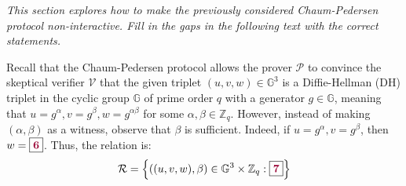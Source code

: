 \documentclass[../lecture-notes-105x135.tex]{subfiles}
\begin{document}
\newpage

    \textit{This section explores how to make the previously considered Chaum-Pedersen protocol non-interactive. Fill in the gaps in the following text with the correct statements.}

    Recall that the Chaum-Pedersen protocol allows the prover $\mathcal{P}$ to convince the skeptical verifier $\mathcal{V}$ that the given triplet $(u,v,w) \in \mathbb{G}^3$ is a Diffie-Hellman (DH) triplet in the cyclic group $\mathbb{G}$ of prime order $q$ with a generator $g \in \mathbb{G}$, meaning that $u=g^{\alpha},v=g^{\beta},w=g^{\alpha\beta}$ for some $\alpha,\beta \in \mathbb{Z}_q$. However, instead of making $(\alpha,\beta)$ as a witness, observe that $\beta$ is sufficient. Indeed, if $u=g^{\alpha},v=g^{\beta}$, then $w=\boxed{\textcolor{purple!80!black}{\textbf{6}}}$. Thus, the relation is:
    \vspace{-2mm}
    \begin{equation*}
        \mathcal{R} = \left\{ ((u,v,w), \beta) \in \mathbb{G}^3 \times \mathbb{Z}_q: \boxed{\textcolor{purple!80!black}{\textbf{7}}} \right\}
    \end{equation*}
    \vspace{-4mm}
\end{document}

